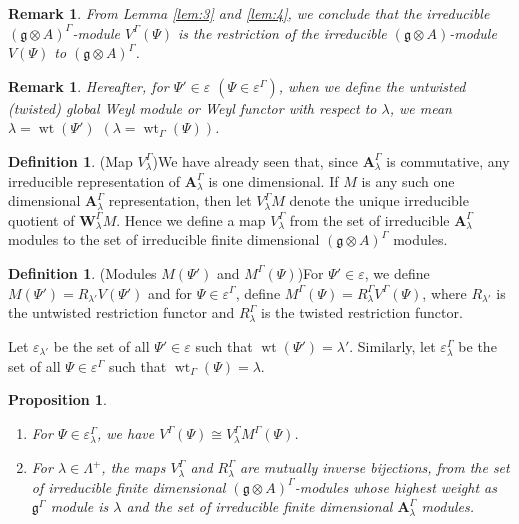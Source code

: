 \documentclass[11pt]{amsart}
\theoremstyle{plain}
\newtheorem{prop}[thm]{Proposition}
\newtheorem{rem}[thm]{Remark}
\theoremstyle{definition}
\newtheorem{defn}[thm]{Definition}
\newcommand{\g}{\mathfrak{g}}
\newcommand{\A}{\mathbf{A}_{\lambda}^{\Gamma}}
\DeclareMathOperator{\wt}{wt}
\begin{document}
\begin{rem}
    From Lemma \ref{lem:3} and \ref{lem:4}, we conclude that the irreducible $(\g\otimes A)^{\Gamma}$-module $V^{\Gamma}(\Psi)$ is the restriction of the irreducible $(\g\otimes A)$-module $V(\Psi)$ to $(\g\otimes A)^{\Gamma}$. 
\end{rem}
\begin{rem}
    Hereafter, for $\Psi'\in\varepsilon$ $(\Psi\in\varepsilon^{\Gamma})$, when we define the untwisted (twisted)  global Weyl module or Weyl functor with respect to $\lambda$, we mean $\lambda=\wt(\Psi')$ $(\lambda=\wt_{\Gamma}(\Psi))$.
\end{rem}
\begin{defn}(Map $V_{\lambda}^{\Gamma}$)\label{def:18}
    We have already seen that, since $\A$ is commutative, any irreducible representation of $\A$ is one dimensional. If $M$ is any such one dimensional $\A$ representation, then let $V_{\lambda}^{\Gamma}M$ denote the unique irreducible quotient of $\mathbf{W}_{\lambda}^{\Gamma}M$. Hence we define a map $V_{\lambda}^{\Gamma}$ from the set of irreducible $\A$ modules to the set of irreducible finite dimensional $(\g\otimes A)^{\Gamma}$ modules.
\end{defn}
\begin{defn}(Modules $M(\Psi')$ and $M^{\Gamma}(\Psi)$)\label{def:2}For $\Psi'\in\varepsilon$, we define $M(\Psi')=R_{\lambda'}V(\Psi')$ and for $\Psi\in\varepsilon^{\Gamma}$, define $M^{\Gamma}(\Psi)=R_{\lambda}^{\Gamma}V^{\Gamma}(\Psi)$, where $R_{\lambda'}$ is the untwisted restriction functor \cite{BCM19} and $R_{\lambda}^{\Gamma}$ is the twisted restriction functor.
\end{defn}
Let $\varepsilon_{\lambda'}$ \label{pg:12} be the set of all $\Psi'\in\varepsilon$ such that $\wt(\Psi')=\lambda'$. Similarly, let $\varepsilon_{\lambda}^{\Gamma}$ be the set of all $\Psi\in\varepsilon^{\Gamma}$ such that $\wt_{\Gamma}(\Psi)=\lambda.$
\begin{prop}\label{prop:4}
    \begin{enumerate}[label=(\alph*)]
\item For $\Psi\in\varepsilon^{\Gamma}_{\lambda}$, we have $V^{\Gamma}(\Psi)\cong V_{\lambda}^{\Gamma}M^{\Gamma}(\Psi)$.
\item For $\lambda\in \Lambda^{+}$, the maps $V_{\lambda}^{\Gamma}$ and $R_{\lambda}^{\Gamma}$ are mutually inverse bijections, from the set of irreducible finite dimensional $(\g\otimes A)^{\Gamma}$-modules whose highest weight as $\g^{\Gamma}$ module is $\lambda$ and the set of irreducible finite dimensional $\A$ modules.
    \end{enumerate}
\end{prop}
\end{document}
